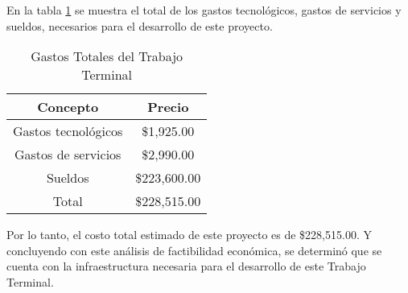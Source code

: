 En la tabla \ref{Gastostotales} se muestra el total de los gastos tecnológicos, gastos de servicios y sueldos, necesarios para el desarrollo de este proyecto.

\begin{table}[H]
	\centering
	\resizebox{10cm}{!} {
		\begin{tabular}{|c|c|}
			\hline
			Concepto & Precio \\ \hline
			Gastos tecnológicos & \$1,925.00 \\ \hline
			Gastos de servicios& \$2,990.00 \\ \hline
			Sueldos &  \$223,600.00 \\ \hline
			Total & \$228,515.00 \\ \hline
		\end{tabular}
	}
	\caption{Gastos Totales del Trabajo Terminal}
	\label{Gastostotales}
\end{table}

Por lo tanto, el costo total estimado de este proyecto es de \$228,515.00. Y concluyendo con este análisis de factibilidad económica, se determinó que se cuenta con la infraestructura necesaria para el desarrollo de este Trabajo Terminal.

 



